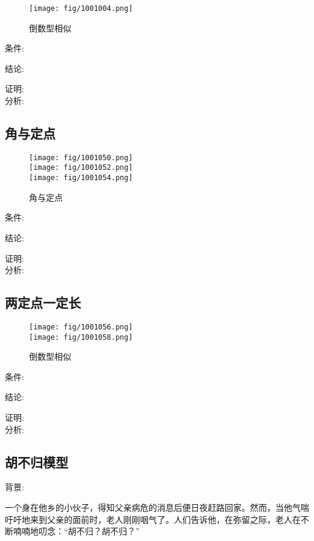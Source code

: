\documentclass[cn,blue,10pt]{elegantbook}
\begin{document}
\begin{figure}[h]
    \centering
    \texttt{[image: fig/1001004.png]}
    \caption{倒数型相似}%
    \label{fig:倒数型相似}
\end{figure}
条件: \(\) 

结论: \( \) 

证明:\\

分析: 
\subsection{角与定点}%
\label{sub:角与定点}

\begin{figure}[h]
    \centering
    \texttt{[image: fig/1001050.png]}\\
    \texttt{[image: fig/1001052.png]}\\
    \texttt{[image: fig/1001054.png]}
    \caption{角与定点}%
    \label{fig:倒数型相似}
\end{figure}
条件: \(\) 

结论: \( \) 

证明:\\

分析: 
\subsection{两定点一定长}%
\label{sub:两定点一定长}

\begin{figure}[h]
    \centering
    \texttt{[image: fig/1001056.png]}\\
    \texttt{[image: fig/1001058.png]}
    \caption{倒数型相似}%
    \label{fig:倒数型相似}
\end{figure}
条件: \(\) 

结论: \( \) 

证明:\\

分析: 

\subsection{胡不归模型}%
\label{sub:胡不归模型}

背景:

一个身在他乡的小伙子，得知父亲病危的消息后便日夜赶路回家。然而，当他气喘吁吁地来到父亲的面前时，老人刚刚咽气了。人们告诉他，在弥留之际，老人在不断喃喃地叨念：“胡不归？胡不归？”
\end{document}
